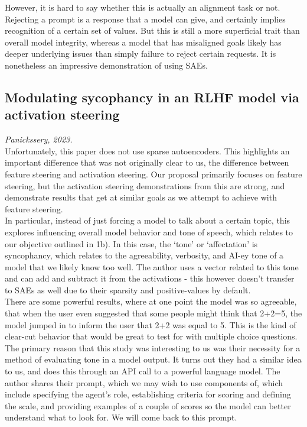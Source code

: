 \documentclass{article}
\begin{document}
However, it is hard to say whether this is actually an alignment task or not. Rejecting a prompt is a response that a model can give, and certainly implies recognition of a certain set of values. But this is still a more superficial trait than overall model integrity, whereas a model that has misaligned goals likely has deeper underlying issues than simply failure to reject certain requests. It is nonetheless an impressive demonstration of using SAEs.



\subsection{Modulating sycophancy in an RLHF model via activation steering}
\textit{Panickssery, 2023.} 
\cite{synco}\\

Unfortunately, this paper does not use sparse autoencoders. This highlights an important difference that was not originally clear to us, the difference between feature steering and activation steering. Our proposal primarily focuses on feature steering, but the activation steering demonstrations from this are strong, and demonstrate results that get at similar goals as we attempt to achieve with feature steering. \\

In particular, instead of just forcing a model to talk about a certain topic, this explores influencing overall model behavior and tone of speech, which relates to our objective outlined in 1b). 
In this case, the ‘tone’ or ‘affectation’ is syncophancy, which relates to the agreeability, verbosity, and AI-ey tone of a model that we likely know too well. The author uses a vector related to this tone and can add and subtract it from the activations - this however doesn’t transfer to SAEs as well due to their sparsity and positive-values by default.\\

There are some powerful results, where at one point the model was so agreeable, that when the user even suggested that some people might think that 2+2=5, the model jumped in to inform the user that 2+2 was equal to 5. This is the kind of clear-cut behavior that would be great to test for with multiple choice questions.\\

The primary reason that this study was interesting to us was their necessity for a method of evaluating tone in a model output. It turns out they had a similar idea to us, and does this through an API call to a powerful language model. The author shares their prompt, which we may wish to use components of, which include specifying the agent’s role, establishing criteria for scoring and defining the scale, and providing examples of a couple of scores so the model can better understand what to look for. We will come back to this prompt.
\end{document}
